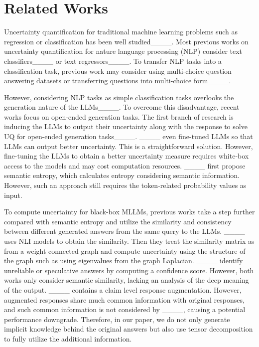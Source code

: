 \section{Related Works}
Uncertainty quantification for traditional machine learning problems such as regression or classification has been well studied____. Most previous works on uncertainty quantification for nature language processing (NLP) consider text classifiers____ or text regressors____. To transfer NLP tasks into a classification task, previous work may consider using multi-choice question answering datasets or transferring questions into multi-choice form____. 

However, considering NLP tasks as simple classification tasks overlooks the generation nature of the LLMs____. To overcome this disadvantage, recent works focus on open-ended generation tasks. The first branch of research is inducing the LLMs to output their uncertainty along with the response to solve UQ for open-ended generation tasks____. ____ even fine-tuned LLMs so that LLMs can output better uncertainty. This is a straightforward solution. However, fine-tuning the LLMs to obtain a better uncertainty measure requires white-box access to the models and may cost computation resources. ____ first propose semantic entropy, which calculates entropy considering semantic information. However, such an approach still requires the token-related probability values as input.

To compute uncertainty for black-box MLLMs, previous works take a step further compared with semantic entropy and utilize the similarity and consistency between different generated answers from the same query to the LLMs. ____ uses NLI models to obtain the similarity. Then they treat the similarity matrix as from a weight connected graph and compute uncertainty using the structure of the graph such as using eigenvalues from the graph Laplacian. ____ identify unreliable or speculative answers by computing a confidence score. However, both works only consider semantic similarity, lacking an analysis of the deep meaning of the output. ____ contains a claim level response augmentation. However,  augmented responses share much common information with original responses, and such common information is not considered by ____, causing a potential performance downgrade.  Therefore, in our paper, we do not only generate implicit knowledge behind the original answers but also use tensor decomposition to fully utilize the additional information.  

\vspace{-3mm}